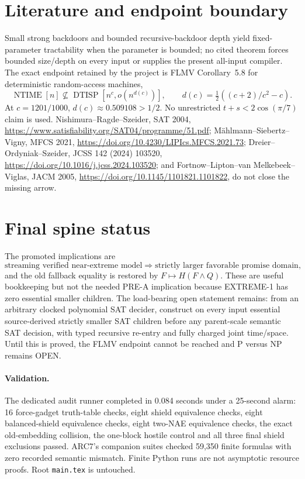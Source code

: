 \documentclass[11pt]{article}
\begin{document}
\section{Literature and endpoint boundary}

Small strong backdoors and bounded recursive-backdoor depth yield
fixed-parameter tractability when the parameter is bounded; no cited theorem
forces bounded size/depth on every input or supplies the present all-input
compiler.  The exact endpoint retained by the project is FLMV Corollary~5.8
for deterministic random-access machines,
\[
\operatorname{NTIME}[n]\not\subseteq
\operatorname{DTISP}[n^c,o(n^{d(c)})],\qquad
d(c)=\tfrac12((c+2)/c^2-c).
\]
At $c=1201/1000$, $d(c)\approx0.509108>1/2$.  No unrestricted
$t+s<2\cos(\pi/7)$ claim is used.  Nishimura--Ragde--Szeider, SAT 2004,
\url{https://www.satisfiability.org/SAT04/programme/51.pdf};
M\"ahlmann--Siebertz--Vigny, MFCS 2021,
\url{https://doi.org/10.4230/LIPIcs.MFCS.2021.73};
Dreier--Ordyniak--Szeider, JCSS 142 (2024) 103520,
\url{https://doi.org/10.1016/j.jcss.2024.103520}; and
Fortnow--Lipton--van Melkebeek--Viglas, JACM 2005,
\url{https://doi.org/10.1145/1101821.1101822}, do not close the missing arrow.

\section{Final spine status}

The promoted implications are
\[
\text{streaming verified near-extreme model}
\Longrightarrow
\text{strictly larger favorable promise domain},
\]
and the old fallback equality is restored by $F\mapsto H(F\wedge Q)$.
These are useful bookkeeping but not the needed PRE-A implication because
\textsc{EXTREME-1}
has zero essential smaller children.  The load-bearing open statement remains:
from an arbitrary clocked polynomial SAT decider, construct on every input
essential source-derived strictly smaller SAT children before any parent-scale
semantic SAT decision, with typed recursive re-entry and fully charged joint
time/space.  Until this is proved, the FLMV endpoint cannot be reached and P
versus NP remains OPEN.

\paragraph{Validation.}
The dedicated audit runner completed in 0.084 seconds under a 25-second
alarm: 16 force-gadget truth-table checks, eight shield equivalence checks,
eight balanced-shield equivalence checks, eight two-NAE equivalence checks,
the exact old-embedding collision, the one-block hostile control and all
three final shield exclusions passed.
ARC7's companion suites checked 59,350 finite formulas with zero recorded
semantic mismatch.  Finite Python runs are not asymptotic resource proofs.
Root \texttt{main.tex} is untouched.
\end{document}

